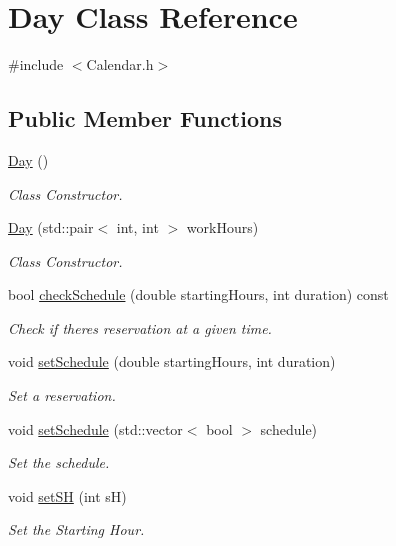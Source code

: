 \hypertarget{class_day}{}\section{Day Class Reference}
\label{class_day}


{\ttfamily \#include $<$Calendar.\+h$>$}

\subsection*{Public Member Functions}
\begin{DoxyCompactItemize}
\item 
\mbox{\hyperlink{class_day_a0d38b5839dd80b179cb8f0669283b3aa}{Day}} ()
\begin{DoxyCompactList}\small\item\em Class Constructor. \end{DoxyCompactList}\item 
\mbox{\hyperlink{class_day_a0ba7af88eca9b5e6ca197c3d40b3ca66}{Day}} (std\+::pair$<$ int, int $>$ work\+Hours)
\begin{DoxyCompactList}\small\item\em Class Constructor. \end{DoxyCompactList}\item 
bool \mbox{\hyperlink{class_day_ae8354b4a88cd98f5513ea6bc5dfb017e}{check\+Schedule}} (double starting\+Hours, int duration) const
\begin{DoxyCompactList}\small\item\em Check if there\textquotesingle{}s reservation at a given time. \end{DoxyCompactList}\item 
void \mbox{\hyperlink{class_day_ad3c8ca8c171a994c59788965166ae36b}{set\+Schedule}} (double starting\+Hours, int duration)
\begin{DoxyCompactList}\small\item\em Set a reservation. \end{DoxyCompactList}\item 
void \mbox{\hyperlink{class_day_aa46e0811bd26355979c6cf9f4e4b9df7}{set\+Schedule}} (std\+::vector$<$ bool $>$ schedule)
\begin{DoxyCompactList}\small\item\em Set the schedule. \end{DoxyCompactList}\item 
void \mbox{\hyperlink{class_day_a6fc6dfeef1c92b9a5395648c4d0c8a70}{set\+SH}} (int sH)
\begin{DoxyCompactList}\small\item\em Set the Starting Hour. \end{DoxyCompactList}\item 

\end{DoxyCompactItemize}
